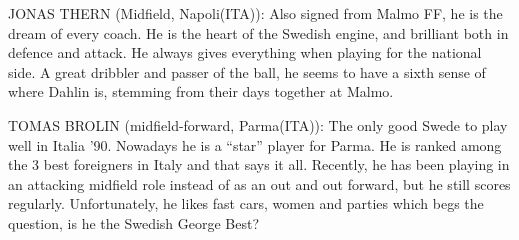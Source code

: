 JONAS THERN (Midfield, Napoli(ITA)):
Also signed from Malmo FF, he is the dream of every coach. He is the heart of 
the Swedish engine, and brilliant both in defence and attack. He always gives
everything when playing for the national side. A great dribbler and passer of 
the ball, he seems to have a sixth sense of where Dahlin is, stemming from their
days together at Malmo.

TOMAS BROLIN (midfield-forward, Parma(ITA)):
The only good Swede to play well in Italia '90. Nowadays he is a ``star'' player 
for Parma. He is ranked among the 3 best foreigners in Italy and that says it 
all. Recently, he has been playing in an attacking midfield role instead of as
an out and out forward, but he still scores regularly. Unfortunately, he likes
fast cars, women and parties which begs the question, is he the Swedish George
Best?
